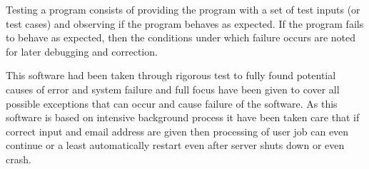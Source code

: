 Testing a program consists of providing the program with a set of test inputs (or test cases) and
observing if the program behaves as expected. If the program fails to behave as expected, then the
conditions under which failure occurs are noted for later debugging and correction. 


This software had been taken through rigorous test to fully found potential causes of error and system failure
and full focus have been given to cover all possible exceptions that can 
occur and cause failure of the software.
As this software is based on intensive background process it have been taken care that 
if correct input and email address are given then processing of user job can even continue or a least automatically 
restart even after server shuts down or even crash.


\begin{table}[h]
\centering
{}



\caption{Tests for Institution Details Page}
\label{table3}
\end{table}

